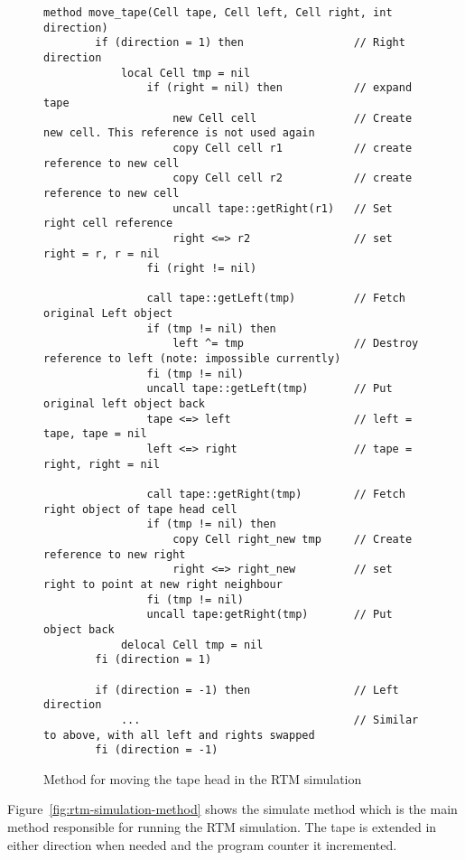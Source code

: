 \begin{figure}[ht]
    \centering
    \begin{lstlisting}[style = basic, language = roopl]
    method move_tape(Cell tape, Cell left, Cell right, int direction)
        if (direction = 1) then                 // Right direction
            local Cell tmp = nil
                if (right = nil) then           // expand tape
                    new Cell cell               // Create new cell. This reference is not used again
                    copy Cell cell r1           // create reference to new cell
                    copy Cell cell r2           // create reference to new cell
                    uncall tape::getRight(r1)   // Set right cell reference
                    right <=> r2                // set right = r, r = nil
                fi (right != nil)         

                call tape::getLeft(tmp)         // Fetch original Left object
                if (tmp != nil) then  
                    left ^= tmp                 // Destroy reference to left (note: impossible currently)
                fi (tmp != nil)   
                uncall tape::getLeft(tmp)       // Put original left object back
                tape <=> left                   // left = tape, tape = nil 
                left <=> right                  // tape = right, right = nil

                call tape::getRight(tmp)        // Fetch right object of tape head cell
                if (tmp != nil) then  
                    copy Cell right_new tmp     // Create reference to new right
                    right <=> right_new         // set right to point at new right neighbour
                fi (tmp != nil)   
                uncall tape:getRight(tmp)       // Put object back
            delocal Cell tmp = nil
        fi (direction = 1)

        if (direction = -1) then                // Left direction
            ...                                 // Similar to above, with all left and rights swapped
        fi (direction = -1)
    \end{lstlisting}
    \caption{Method for moving the tape head in the RTM simulation}
    \label{fig:rtm-move-tape-head-method}
\end{figure}

Figure~\ref{fig:rtm-simulation-method} shows the simulate method which is the main method responsible for running the RTM simulation. The tape is extended in either direction when needed and the program counter it incremented.

